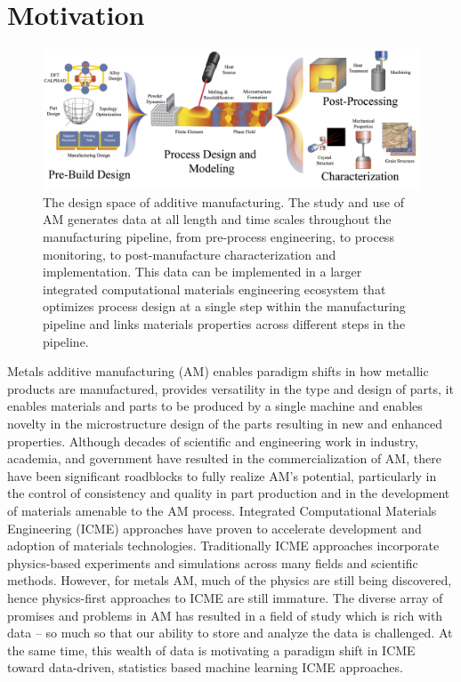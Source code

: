 \section{Motivation}
\begin{figure}[t]
	\includegraphics[width=1\linewidth]{Images/AMgene.png}
	\caption{The design space of additive manufacturing. The study and use of AM generates data at all length and time scales throughout the manufacturing pipeline, from pre-process engineering, to process monitoring, to post-manufacture characterization and implementation. This data can be implemented in a larger integrated computational materials engineering ecosystem that optimizes process design at a single step within the manufacturing pipeline and links materials properties across different steps in the pipeline.}
	\label{AMgene}
\end{figure}

Metals additive manufacturing (AM) enables paradigm shifts in how metallic products are manufactured, provides versatility in the type and design of parts, it enables materials and parts to be produced by a single machine and enables novelty in the microstructure design of the parts resulting in new and enhanced properties. Although decades of scientific and engineering work in industry, academia, and government have resulted in the commercialization of AM, there have been significant roadblocks to fully realize AM's potential, particularly in the control of consistency and quality in part production and in the development of materials amenable to the AM process. Integrated Computational Materials Engineering (ICME) approaches have proven to accelerate development and adoption of materials technologies. Traditionally ICME approaches incorporate physics-based experiments and simulations across many fields and scientific methods. However, for metals AM, much of the physics are still being discovered, hence physics-first approaches to ICME are still immature. The diverse array of promises and problems in AM has resulted in a field of study which is rich with data -- so much so that our ability to store and analyze the data is challenged. At the same time, this wealth of data is motivating a paradigm shift in ICME toward data-driven, statistics based machine learning ICME approaches. 

